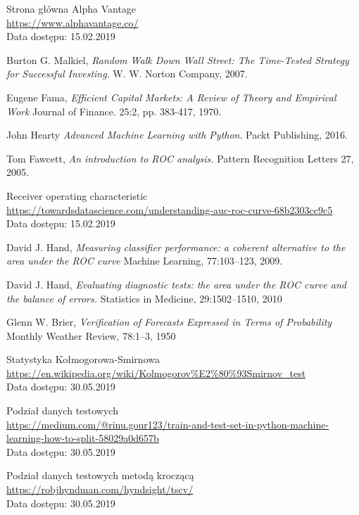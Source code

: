\documentclass[a4paper, twoside, 11pt, openright]{article}
\begin{document}
\begin{thebibliography}{9}
Strona główna Alpha Vantage
\\\url{https://www.alphavantage.co/}
\\Data dostępu: 15.02.2019

  Burton G. Malkiel,
  \textit{Random Walk Down Wall Street: The Time-Tested Strategy for Successful Investing}.
  W. W. Norton Company,
  2007.

  Eugene Fama,
  \textit{Efficient Capital Markets: A Review of Theory and Empirical Work}
  Journal of Finance. 25:2, pp. 383-417, 1970.

  John Hearty
  \textit{Advanced Machine Learning with Python}.
  Packt Publishing,
  2016.

	Tom Fawcett, 
  \textit{An introduction to ROC analysis.}
  Pattern Recognition Letters 27,
  2005.

	Receiver operating characteristic
	\\\url{https://towardsdatascience.com/understanding-auc-roc-curve-68b2303cc9c5} 
	\\Data dostępu: 15.02.2019

	David J. Hand, 
  \textit{Measuring classifier performance: a coherent alternative to the area under the ROC curve}
  Machine Learning, 77:103–123, 2009.

	David J. Hand, 
  \textit{Evaluating diagnostic tests: the area under the ROC curve and the balance of errors.}
 Statistics in Medicine, 29:1502–1510, 2010

	Glenn W. Brier, 
  \textit{Verification of Forecasts Expressed in Terms of Probability}
  Monthly Weather Review, 78:1–3, 1950

	Statystyka Kołmogorowa-Smirnowa
 \\\url{https://en.wikipedia.org/wiki/Kolmogorov%E2%80%93Smirnov_test}
 \\Data dostępu: 30.05.2019


 Podział danych testowych 
 \\\url{https://medium.com/@rinu.gour123/train-and-test-set-in-python-machine-learning-how-to-split-58029a0d657b} 
 \\Data dostępu: 30.05.2019
 
 
 Podział danych testowych metodą kroczącą 
 \\\url{https://robjhyndman.com/hyndsight/tscv/}
\\Data dostępu: 30.05.2019
 

\end{thebibliography}
\end{document}
